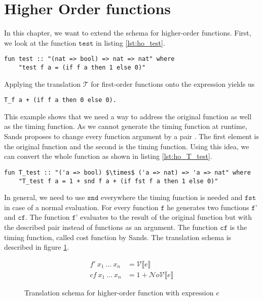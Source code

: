 
\section{Higher Order functions} \label{chapter:higher_order}

In this chapter, we want to extend the schema for higher-order functions.
First, we look at the function $\texttt{test}$ in listing \ref{lst:ho_test}.
\begin{lstlisting}[language=isabelle,mathescape=true,label=lst:ho_test,caption=Example function]
  fun test :: "(nat => bool) => nat => nat" where
    "test f a = (if f a then 1 else 0)"
\end{lstlisting}
Applying the translation $\mathcal{T}$ for first-order functions onto the expression yields us
\begin{lstlisting}[language=isabelle,mathescape=true]
  T_f a + (if f a then 0 else 0).
\end{lstlisting}

This example shows that we need a way to address the original function as well as the timing function.
As we cannot generate the timing function at runtime, Sands proposes to change every function argument by a pair \parencite{sands}.
The first element is the original function and the second is the timing function.
Using this idea, we can convert the whole function as shown in listing \ref{lst:ho_T_test}.
\begin{lstlisting}[language=isabelle,mathescape=true,label=lst:ho_T_test,caption=Timing function of example function]
  fun T_test :: "('a => bool) $\times$ ('a => nat) => 'a => nat" where
    "T_test f a = 1 + snd f a + (if fst f a then 1 else 0)"
\end{lstlisting}
In general, we need to use $\texttt{snd}$ everywhere the timing function is needed and $\texttt{fst}$ in case of a normal evaluation.
For every function $\texttt{f}$ he generates two functions $\texttt{f'}$ and $\texttt{cf}$.
The function $\texttt{f'}$ evaluates to the result of the original function but with the described pair instead of functions as an argument.
The function $\texttt{cf}$ is the timing function, called cost function by Sands.
The translation schema is described in figure \ref{fig:higher_transl}.
\begin{figure}
  \begin{align*}
  f'\ x_{1}\ \dots\ x_{n} &= \mathcal{V}\llbracket e \rrbracket \\
  cf\ x_{1}\ \dots\ x_{n} &= 1 + \mathcal{N}o\mathcal{V}\llbracket e \rrbracket
  \end{align*}
  \caption{Translation schema for higher-order function with expression $e$}
  \label{fig:higher_transl}
\end{figure}

